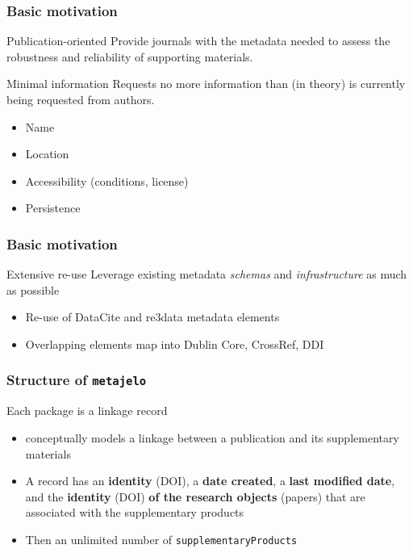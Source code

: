 \begin{frame}
\frametitle{Basic motivation}
\begin{block}{Publication-oriented}
	Provide journals with the metadata needed to assess the robustness and reliability of supporting materials.
	
\end{block}

\begin{block}{Minimal information}
Requests no more information than (in theory) is currently being requested from authors.
\begin{itemize}
	\item Name
	\item Location
	\item Accessibility (conditions, license)
	\item Persistence
\end{itemize}
\end{block}
\end{frame}


\begin{frame}
\frametitle{Basic motivation}
\begin{block}{Extensive re-use}
Leverage existing metadata \textit{\color{ForestGreen} schemas} and \textit{\color{MidnightBlue} infrastructure} as much as possible
\begin{itemize}
	\item Re-use of {\color{ForestGreen} DataCite} and {\color{ForestGreen} re3data} metadata elements
	\item Overlapping elements map into Dublin Core, CrossRef, DDI
\end{itemize}
\end{block}
\end{frame}



\begin{frame}
\frametitle{Structure of \texttt{metajelo}}
\begin{block}{Each package is a linkage record}
	\begin{itemize}
		\item  conceptually models a linkage between a publication and its supplementary materials
		\item A record has an \textbf{identity} (\ac{DOI}), a \textbf{date created}, a \textbf{last modified date}, and the \textbf{identity} (\ac{DOI}) \textbf{of the research objects} (papers) that are associated with the supplementary products
		\item Then an unlimited number of \texttt{supplementaryProducts}
	\end{itemize}
\end{block}
\end{frame}
		
